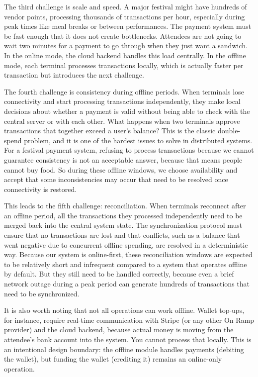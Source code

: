 The third challenge is scale and speed. A major festival might have hundreds of vendor points, processing thousands of transactions per hour, especially during peak times like meal breaks or between performances. The payment system must be fast enough that it does not create bottlenecks. Attendees are not going to wait two minutes for a payment to go through when they just want a sandwich. In the online mode, the cloud backend handles this load centrally. In the offline mode, each terminal processes transactions locally, which is actually faster per transaction but introduces the next challenge.

The fourth challenge is consistency during offline periods. When terminals lose connectivity and start processing transactions independently, they make local decisions about whether a payment is valid without being able to check with the central server or with each other. What happens when two terminals approve transactions that together exceed a user's balance? This is the classic double-spend problem, and it is one of the hardest issues to solve in distributed systems. For a festival payment system, refusing to process transactions because we cannot guarantee consistency is not an acceptable answer, because that means people cannot buy food. So during these offline windows, we choose availability and accept that some inconsistencies may occur that need to be resolved once connectivity is restored.

This leads to the fifth challenge: reconciliation. When terminals reconnect after an offline period, all the transactions they processed independently need to be merged back into the central system state. The synchronization protocol must ensure that no transactions are lost and that conflicts, such as a balance that went negative due to concurrent offline spending, are resolved in a deterministic way. Because our system is online-first, these reconciliation windows are expected to be relatively short and infrequent compared to a system that operates offline by default. But they still need to be handled correctly, because even a brief network outage during a peak period can generate hundreds of transactions that need to be synchronized.

It is also worth noting that not all operations can work offline. Wallet top-ups, for instance, require real-time communication with Stripe (or any other On Ramp provider) and the cloud backend, because actual money is moving from the attendee's bank account into the system. You cannot process that locally. This is an intentional design boundary: the offline module handles payments (debiting the wallet), but funding the wallet (crediting it) remains an online-only operation.

